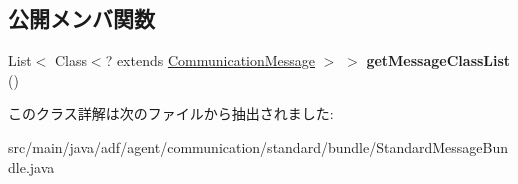 \subsection*{公開メンバ関数}
\begin{DoxyCompactItemize}
\item 
\hypertarget{classadf_1_1agent_1_1communication_1_1standard_1_1bundle_1_1StandardMessageBundle_a2f5c4a6d19b46062119a697d66821292}{}\label{classadf_1_1agent_1_1communication_1_1standard_1_1bundle_1_1StandardMessageBundle_a2f5c4a6d19b46062119a697d66821292} 
List$<$ Class$<$? extends \hyperlink{classadf_1_1component_1_1communication_1_1CommunicationMessage}{Communication\+Message} $>$ $>$ {\bfseries get\+Message\+Class\+List} ()
\end{DoxyCompactItemize}


このクラス詳解は次のファイルから抽出されました\+:\begin{DoxyCompactItemize}
\item 
src/main/java/adf/agent/communication/standard/bundle/Standard\+Message\+Bundle.\+java\end{DoxyCompactItemize}
